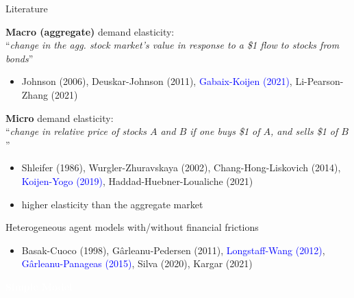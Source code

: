 \begin{frame}{Literature}
    \begin{wideitemize}
        \item \textbf{Macro (aggregate)} demand elasticity:\\ {\footnotesize ``\textit{change in the agg. stock market's value in response to a \$1 flow to stocks from bonds}''}
        \begin{itemize}
            \item {\scriptsize Johnson (2006), Deuskar-Johnson (2011), \textcolor{blue}{Gabaix-Koijen (2021)},  Li-Pearson-Zhang (2021)}
        \end{itemize}
        \item \textbf{Micro} demand elasticity:\\
        {\footnotesize ``\textit{change in relative price of stocks $A$ and $B$ if one buys \$1 of $A$, and sells \$1 of $B$}''}
        \begin{itemize}
            \item {\scriptsize Shleifer (1986), Wurgler-Zhuravskaya (2002), Chang-Hong-Liskovich (2014), \textcolor{blue}{Koijen-Yogo (2019)}, Haddad-Huebner-Loualiche (2021)}\vspM
            \item higher elasticity than the aggregate market 
        \end{itemize}
        \item Heterogeneous agent models with/without financial frictions
        \begin{itemize}
            \item {\scriptsize Basak-Cuoco (1998), Gârleanu-Pedersen (2011), \textcolor{blue}{Longstaff-Wang (2012)}, \textcolor{blue}{Gârleanu-Panageas (2015)}, Silva (2020), Kargar (2021)}
        \end{itemize}
    \end{wideitemize}
\end{frame}

\begin{transitionframe}
	\begin{center}
		\huge \textcolor{white}{\textbf{Simple Model}}
	\end{center}
\end{transitionframe}

